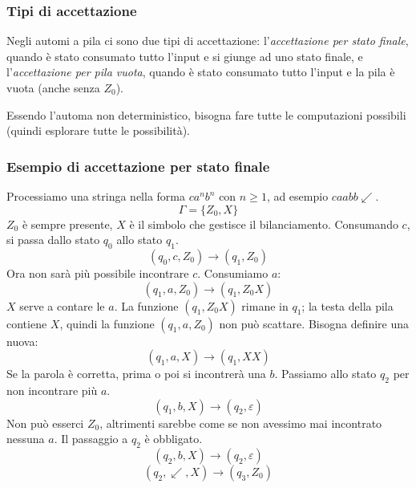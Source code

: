 \documentclass[11pt]{article}
\begin{document}
\subsubsection{Tipi di accettazione}
Negli automi a pila ci sono due tipi di accettazione: l'\textit{accettazione per stato finale}, quando è stato consumato 
tutto l'input e si giunge ad uno stato finale, e l'\textit{accettazione per pila vuota}, quando è stato consumato tutto 
l'input e la pila è vuota (anche senza $Z_0$).

Essendo l'automa non deterministico, bisogna fare tutte le computazioni possibili (quindi esplorare tutte le possibilità).
\subsubsection{Esempio di accettazione per stato finale}
Processiamo una stringa nella forma $ca^nb^n$ con $n\geq 1$, ad esempio $caabb\swarrow$. 
\begin{equation*}
    \Gamma=\{Z_0,X\}
\end{equation*}
$Z_0$ è sempre presente, $X$ è il simbolo che gestisce il bilanciamento. Consumando $c$, si passa dallo stato $q_0$ allo 
stato $q_1$.
\begin{equation*}
    (q_0,c,Z_0)\rightarrow(q_1,Z_0)
\end{equation*}
Ora non sarà più possibile incontrare $c$. Consumiamo $a$:
\begin{equation*}
    (q_1,a,Z_0)\rightarrow(q_1,Z_0X)
\end{equation*}
$X$ serve a contare le $a$. La funzione $(q_1,Z_0X)$ rimane in $q_1$; la testa della pila contiene $X$, quindi la funzione
$(q_1,a,Z_0)$ non può scattare. Bisogna definire una nuova:
\begin{equation*}
    (q_1,a,X)\rightarrow(q_1,XX)
\end{equation*}
Se la parola è corretta, prima o poi si incontrerà una $b$. Passiamo allo stato $q_2$ per non incontrare più $a$.
\begin{equation*}
    (q_1,b,X)\rightarrow(q_2,\varepsilon)
\end{equation*}
Non può esserci $Z_0$, altrimenti sarebbe come se non avessimo mai incontrato nessuna $a$. Il passaggio a $q_2$ è obbligato.
\begin{equation*}
    (q_2,b,X)\rightarrow(q_2,\varepsilon)
\end{equation*}
\begin{equation*}
    (q_2,\swarrow,X)\rightarrow(q_3,Z_0)
\end{equation*}
\end{document}
